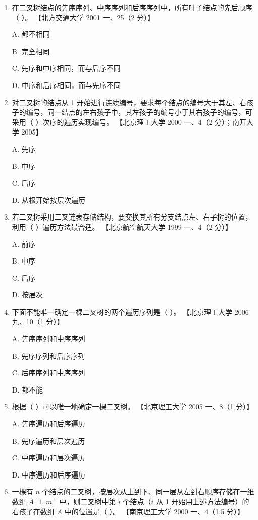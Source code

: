 \documentclass[lang=cn,newtx,10pt,scheme=chinese]{../../elegantbook}
\begin{document}
\begin{enumerate}
    \item 在二叉树结点的先序序列、中序序列和后序序列中，所有叶子结点的先后顺序（ ）。  
    【北方交通大学 2001 一、25（2 分）】 

    A. 都不相同  

    B. 完全相同  

    C. 先序和中序相同，而与后序不同  

    D. 中序和后序相同，而与先序不同  

    \item 对二叉树的结点从 1 开始进行连续编号，要求每个结点的编号大于其左、右孩子的编号，同一结点的左右孩子中，其左孩子的编号小于其右孩子的编号，可采用（ ）次序的遍历实现编号。  
    【北京理工大学 2000 一、4（2 分）；南开大学 2005】  

    A. 先序  

    B. 中序  

    C. 后序  

    D. 从根开始按层次遍历  

    \item 若二叉树采用二叉链表存储结构，要交换其所有分支结点左、右子树的位置，利用（ ）遍历方法最合适。  
    【北京航空航天大学 1999 一、4（2 分）】

    A. 前序  

    B. 中序  

    C. 后序  



    D. 按层次  

    \item 下面不能唯一确定一棵二叉树的两个遍历序列是（ ）。  
    【北京理工大学 2006 九、10（1 分）】  

    A. 先序序列和中序序列  

    B. 先序序列和后序序列  

    C. 后序序列和中序序列 

    D. 都不能  

    \item 根据（ ）可以唯一地确定一棵二叉树。  
    【北京理工大学 2005 一、8（1 分）】  

    A. 先序遍历和后序遍历  

    B. 先序遍历和层次遍历  

    C. 中序遍历和层次遍历  

    D. 中序遍历和后序遍历  

    \item 一棵有 $n$ 个结点的二叉树，按层次从上到下、同一层从左到右顺序存储在一维数组 $A[1..m]$ 中，则二叉树中第 $i$ 个结点（$i$ 从 1 开始用上述方法编号）的右孩子在数组 $A$ 中的位置是（ ）。  
    【南京理工大学 2000 一、4（1.5 分）】  


\end{enumerate}
\end{document}
